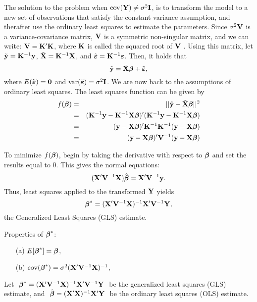 \vb
The solution to the problem when $\mathrm{cov}(\mathbf{Y}) \neq \sigma^2\mathbf{I}$, is to transform the model to a new set of observations that satisfy the constant variance assumption, and therafter use the ordinary least squares to estimate the parameters.
Since $\sigma^2 \mathbf{V}$ is a variance-covariance matrix, $\mathbf{V}$ is a symmetric non-singular
matrix, and we can write: $\mathbf{V} = \mathbf{K}' \mathbf{K}$, where $\mathbf{K}$ is called the squared root
of
$\mathbf{V}$ . Using this matrix,  let ${\tilde {\mathbf{y}}} = \mathbf{K}^{-1}\mathbf{y}$, ${\tilde {\mathbf{X}}} = 
\mathbf{K}^{-1}\mathbf{X}$, and $ {\tilde {\mbox{\boldmath $\varepsilon$}}} = \mathbf{K}^{-1}  \mbox{\boldmath $\varepsilon$}$. Then, it holds that 
$$
{\tilde {\mathbf{y}}} = {\tilde {\mathbf{X}}} \mbox{\boldmath $\beta$} + {\tilde {\mbox{\boldmath $\varepsilon$}}},
$$
where 
$E({\tilde {\mbox{\boldmath $\varepsilon$}}}) = {\bf 0}$ and $\mathrm{var}({\tilde {\mbox{\boldmath $\varepsilon$}}}) = \sigma^2\mathbf{I}$.
We are now back to the assumptions of ordinary least squares. The least squares function can be given by
\begin{eqnarray*}
f(\boldsymbol{\beta}) &=& || {\tilde {\mathbf{y}}} - {\tilde {\mathbf{X}}} \boldsymbol{\beta} ||^2 \\
&=& (\mathbf{K}^{-1}\mathbf{y} - \mathbf{K}^{-1}\mathbf{X} \boldsymbol{\beta})' (\mathbf{K}^{-1}\mathbf{y} - \mathbf{K}^{-1}\mathbf{X} \boldsymbol{\beta})\\
&=& (\mathbf{y} - \mathbf{X} \boldsymbol{\beta})' \mathbf{K}^{-1}\mathbf{K}^{-1} (\mathbf{y} - \mathbf{X} \boldsymbol{\beta})\\
&=& (\mathbf{y} - \mathbf{X} \boldsymbol{\beta})' \mathbf{V}^{-1} (\mathbf{y} - \mathbf{X} \boldsymbol{\beta})\\
\end{eqnarray*}

To minimize $f(\boldsymbol{\beta})$, begin by
taking the derivative with respect to $\boldsymbol{\beta}$ and set the results equal to $0$. This 
gives the normal equations:
$$(\mathbf{X}'\mathbf{V}^{-1} \mathbf{X}) \hat {\boldsymbol{\beta}} = \mathbf{X}' \mathbf{V}^{-1} \mathbf{y}.$$
Thus, least
squares applied to the transformed $\mathbf{Y}$ yields
$$
\mbox{\boldmath $\beta$}^* = (\mathbf{X}'\mathbf{V}^{-1}\mathbf{X})^{-1}\mathbf{X}'\mathbf{V}^{-1}\mathbf{Y},
$$
the Generalized Least Squares (GLS) estimate.

\bstheo 
Properties of $\mbox{\boldmath $\beta$}^*$:
\begin{itemize}
\item[(a)] 
$E[\mbox{\boldmath $\beta$}^*] = \mbox{\boldmath $\beta$}$,
\item[(b)] 
$\mathrm{cov}(\mbox{\boldmath $\beta$}^*) = \sigma^2(\mathbf{X}'\mathbf{V}^{-1}\mathbf{X})^{-1}$,
\end{itemize}
\etheo

Let $\ \mbox{\boldmath $\beta$}^* = (\mathbf{X}'\mathbf{V}^{-1}\mathbf{X})^{-1}\mathbf{X}'\mathbf{V}^{-1}\mathbf{Y}\ $ be
the generalized least squares (GLS) estimate, and $\ \hat{\bfbet} =
(\bfX'\bfX)^{-1}\bfX'\bfY\ $ be the ordinary least squares (OLS)
estimate.


